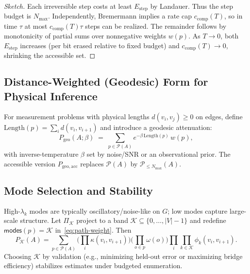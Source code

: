 \begin{proof}[Sketch]
Each irreversible step costs at least $E_{\mathrm{step}}$ by Landauer.
Thus the step budget is $N_{\max}$. Independently, Bremermann implies a rate cap $c_{\mathrm{comp}}(T)$,
so in time $\tau$ at most $c_{\mathrm{comp}}(T)\tau$ steps can be realized. The remainder follows by monotonicity
of partial sums over nonnegative weights $w(p)$. As $T\!\to\!0$, both $E_{\mathrm{step}}$ increases
(per bit erased relative to fixed budget) and $c_{\mathrm{comp}}(T)\to 0$, shrinking the accessible set.
\end{proof}

\subsection{Distance-Weighted (Geodesic) Form for Physical Inference}
\label{subsec:geodesic-form}

For measurement problems with physical lengths $d(v_i,v_j)\ge 0$ on edges, define
$\mathrm{Length}(p)=\sum_i d(v_i,v_{i+1})$ and introduce a geodesic attenuation:
\begin{equation}
P_{\mathrm{geo}}(A;\beta)
\;=\;
\sum_{p\in\mathcal{P}(A)} e^{-\beta\,\mathrm{Length}(p)}\, w(p),
\label{eq:Pgeo}
\end{equation}
with inverse-temperature $\beta$ set by noise/SNR or an observational prior. The accessible
version $P_{\mathrm{geo,acc}}$ replaces $\mathcal{P}(A)$ by $\mathcal{P}_{\le N_{\max}}(A)$.

\subsection{Mode Selection and Stability}
\label{subsec:mode-selection}

High-$\lambda_k$ modes are typically oscillatory/noise-like on $G$; low modes capture large-scale structure.
Let $\Pi_{\mathcal{K}}$ project to a band $\mathcal{K}\subseteq\{0,\dots,|V|-1\}$ and redefine
$\mathsf{modes}(p)=\mathcal{K}$ in~\eqref{eq:path-weight}. Then
\begin{equation}
P_{\mathcal{K}}(A)
=
\sum_{p\in\mathcal{P}(A)}
\Bigg(\prod_{i}\kappa(v_i,v_{i+1})\Bigg)
\Bigg(\prod_{o\in p}\omega(o)\Bigg)
\prod_{i}\prod_{k\in\mathcal{K}} \phi_k(v_i,v_{i+1}).
\label{eq:bandpass-P}
\end{equation}
Choosing $\mathcal{K}$ by validation (e.g., minimizing held-out error or maximizing bridge efficiency)
stabilizes estimates under budgeted enumeration.

